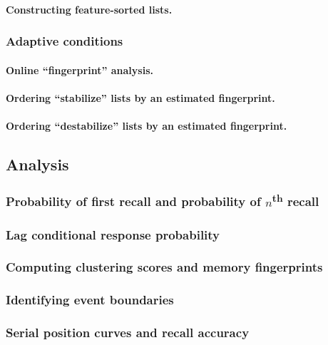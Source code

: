 \documentclass[11pt]{article}
\begin{document}
\paragraph{Constructing feature-sorted lists.}


\subsubsection*{Adaptive conditions}

\paragraph{Online ``fingerprint'' analysis.}

\paragraph{Ordering ``stabilize'' lists by an estimated fingerprint.}

\paragraph{Ordering ``destabilize'' lists by an estimated fingerprint.}

\subsection*{Analysis}

\subsubsection*{Probability of first recall and probability of $n$\textsuperscript{th} recall}

\subsubsection*{Lag conditional response probability}

\subsubsection*{Computing clustering scores and memory fingerprints}

\subsubsection*{Identifying event boundaries}

\subsubsection*{Serial position curves and recall accuracy}
\end{document}
